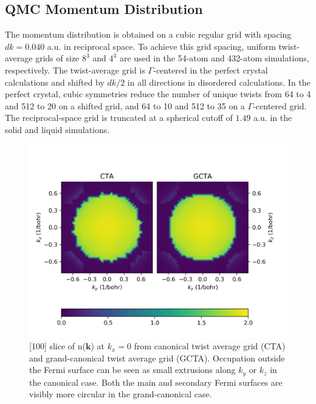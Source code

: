 \documentclass[aps,prl,superscriptaddress]{revtex4-1}
\newcommand{\bs}{\boldsymbol}
\begin{document}
\subsection{QMC Momentum Distribution}

The momentum distribution is obtained on a cubic regular grid with spacing $dk=0.040$ a.u. in reciprocal space. To achieve this grid spacing, uniform twist-average grids of size $8^3$ and $4^3$ are used in the 54-atom and 432-atom simulations, respectively. The twist-average grid is $\Gamma$-centered in the perfect crystal calculations and shifted by $dk/2$ in all directions in disordered calculations. In the perfect crystal, cubic symmetries reduce the number of unique twists from 64 to 4 and 512 to 20 on a shifted grid, and 64 to 10 and 512 to 35 on a $\Gamma$-centered grid. The reciprocal-space grid is truncated at a spherical cutoff of $1.49$ a.u. in the solid and liquid simulations.

\begin{figure}[h]
\includegraphics[width=0.8\linewidth]{li53_anofk-n54-ta-nk2d}
\caption{[100] slice of n($\bs{k}$) at $k_x=0$ from canonical twist average grid (CTA) and grand-canonical twist average grid (GCTA). Occupation outside the Fermi surface can be seen as small extrusions along $k_y$ or $k_z$ in the canonical case. Both the main and secondary Fermi surfaces are visibly more circular in the grand-canonical case.}
\end{figure}
\end{document}
